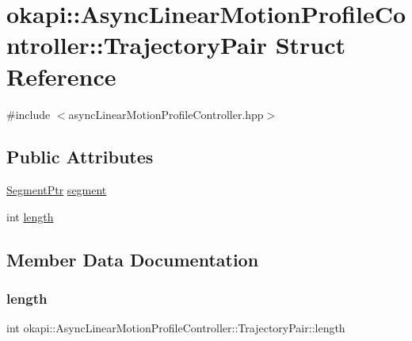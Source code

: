 \hypertarget{structokapi_1_1AsyncLinearMotionProfileController_1_1TrajectoryPair}{}\section{okapi\+::Async\+Linear\+Motion\+Profile\+Controller\+::Trajectory\+Pair Struct Reference}
\label{structokapi_1_1AsyncLinearMotionProfileController_1_1TrajectoryPair}


{\ttfamily \#include $<$async\+Linear\+Motion\+Profile\+Controller.\+hpp$>$}

\subsection*{Public Attributes}
\begin{DoxyCompactItemize}
\item 
\mbox{\hyperlink{classokapi_1_1AsyncLinearMotionProfileController_a714a13979ef81d5fbca93264d044b8cc}{Segment\+Ptr}} \mbox{\hyperlink{structokapi_1_1AsyncLinearMotionProfileController_1_1TrajectoryPair_a288d267243a16f96a8ba701b0adc1722}{segment}}
\item 
int \mbox{\hyperlink{structokapi_1_1AsyncLinearMotionProfileController_1_1TrajectoryPair_a66c7b592d667cac8582564c5ced6f970}{length}}
\end{DoxyCompactItemize}


\subsection{Member Data Documentation}
\mbox{\label{structokapi_1_1AsyncLinearMotionProfileController_1_1TrajectoryPair_a66c7b592d667cac8582564c5ced6f970}} 
\subsubsection{\texorpdfstring{length}{length}}
{\footnotesize\ttfamily int okapi\+::\+Async\+Linear\+Motion\+Profile\+Controller\+::\+Trajectory\+Pair\+::length}

